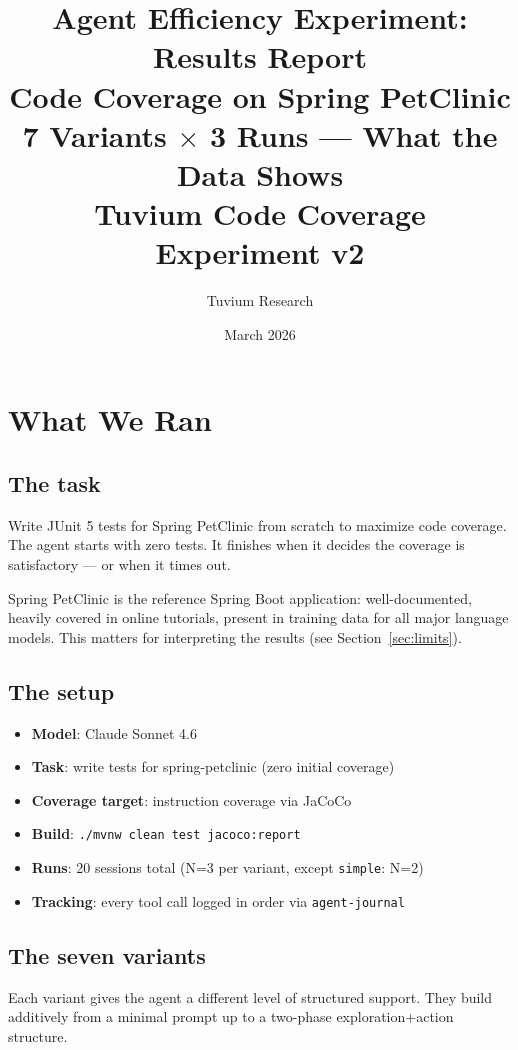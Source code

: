 \documentclass[11pt,a4paper]{article}
\title{\textbf{Agent Efficiency Experiment: Results Report}\\[0.4em]
\large Code Coverage on Spring PetClinic\\
7 Variants $\times$ 3 Runs --- What the Data Shows\\[0.6em]
\normalsize Tuvium Code Coverage Experiment v2}
\author{Tuvium Research}
\date{March 2026}
\begin{document}
\maketitle
\tableofcontents
\newpage

\section{What We Ran}

\subsection*{The task}

Write JUnit 5 tests for Spring PetClinic from scratch to maximize code coverage.
The agent starts with zero tests.
It finishes when it decides the coverage is satisfactory --- or when it times out.

Spring PetClinic is the reference Spring Boot application: well-documented,
heavily covered in online tutorials, present in training data for all major language models.
This matters for interpreting the results (see Section~\ref{sec:limits}).

\subsection*{The setup}

\begin{itemize}
  \item \textbf{Model}: Claude Sonnet 4.6
  \item \textbf{Task}: write tests for spring-petclinic (zero initial coverage)
  \item \textbf{Coverage target}: instruction coverage via JaCoCo
  \item \textbf{Build}: \texttt{./mvnw clean test jacoco:report}
  \item \textbf{Runs}: 20 sessions total (N=3 per variant, except \texttt{simple}: N=2)
  \item \textbf{Tracking}: every tool call logged in order via \texttt{agent-journal}
\end{itemize}

\subsection*{The seven variants}

Each variant gives the agent a different level of structured support.
They build additively from a minimal prompt up to a two-phase exploration+action structure.
\end{document}
